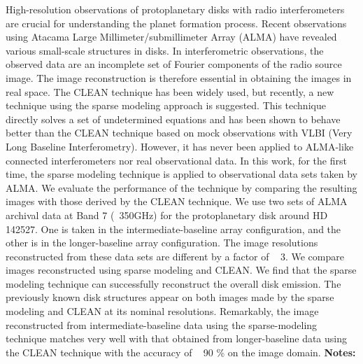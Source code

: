 \documentclass{report}
\begin{document}
{{{{{{{{{{{{{{{{{{{{{{{{{{{{{{{{{{{{{{{{{{{{{{{{{{{{{{{{{{{{{{{{{{{{{{{{{{{{{{{{{{{{{{{{{{{{{{{{{{{{{{{{{{{{{{{{{{{{{{{{{{{{{{{{{{{{{{{{{{{{{{{{{{{{{{{{{{{{{{{{{{{{{{{{{{{{{{{{{{{{{{{{{{{{{{{{{{{{{{{{{{{{High-resolution observations of protoplanetary disks with radio interferometers are crucial for understanding the planet formation process. Recent observations using Atacama Large Millimeter/submillimeter Array (ALMA) have revealed various small-scale structures in disks. In interferometric observations, the observed data are an incomplete set of Fourier components of the radio source image. The image reconstruction is therefore essential in obtaining the images in real space. The CLEAN technique has been widely used, but recently, a new technique using the sparse modeling approach is suggested. This technique directly solves a set of undetermined equations and has been shown to behave better than the CLEAN technique based on mock observations with VLBI (Very Long Baseline Interferometry). However, it has never been applied to ALMA-like connected interferometers nor real observational data. In this work, for the first time, the sparse modeling technique is applied to observational data sets taken by ALMA. We evaluate the performance of the technique by comparing the resulting images with those derived by the CLEAN technique. We use two sets of ALMA archival data at Band 7 (~350GHz) for the protoplanetary disk around HD 142527. One is taken in the intermediate-baseline array configuration, and the other is in the longer-baseline array configuration. The image resolutions reconstructed from these data sets are different by a factor of ~ 3. We compare images reconstructed using sparse modeling and CLEAN. We find that the sparse modeling technique can successfully reconstruct the overall disk emission. The previously known disk structures appear on both images made by the sparse modeling and CLEAN at its nominal resolutions. Remarkably, the image reconstructed from intermediate-baseline data using the sparse-modeling technique matches very well with that obtained from longer-baseline data using the CLEAN technique with the accuracy of ~ 90 \% on the image domain.\newline
{\bf Notes:}\newline
{\newpage
}}}}}}}}}}}}}}}}}}}}}}}}}}}}}}}}}}}}}}}}}}}}}}}}}}}}}}}}}}}}}}}}}}}}}}}}}}}}}}}}}}}}}}}}}}}}}}}}}}}}}}}}}}}}}}}}}}}}}}}}}}}}}}}}}}}}}}}}}}}}}}}}}}}}}}}}}}}}}}}}}}}}}}}}}}}}}}}}}}}}}}}}}}}}}}}}}}}}}}}}}}}}}
\end{document}
